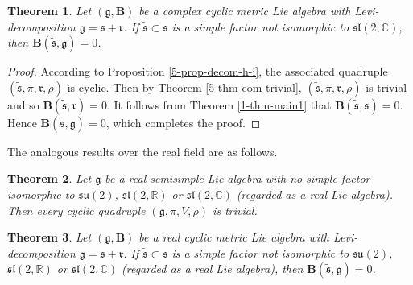 \documentclass[reqno]{amsart}
\newtheorem{thm}{Theorem}[section]
\theoremstyle{definition}
\begin{document}
\begin{thm}\label{5-thm-nondegerate-sl(2)}
Let  $(\mathfrak{g},\mathbf{B})$ be a complex  cyclic metric Lie algebra with Levi-decomposition $\mathfrak{g}=\mathfrak{s}+\mathfrak{r}$. If  $\tilde{\mathfrak{s}}\subset \mathfrak{s}$ is a simple factor  not isomorphic to $\mathfrak{sl}(2,\mathbb{C})$, then $\mathbf{B}(\tilde{\mathfrak{s}},\mathfrak{g})=0$.
\end{thm}
\begin{proof}
According to Proposition \ref{5-prop-decom-h-i}, the associated quadruple $(\tilde{\mathfrak{s}},\pi,\mathfrak{r},\rho)$ is cyclic. Then by Theorem \ref{5-thm-com-trivial}, $(\tilde{\mathfrak{s}},\pi,\mathfrak{r},\rho)$ is trivial and so
$\mathbf{B}(\tilde{\mathfrak{s}},\mathfrak{r})=0$.
It follows from Theorem \ref{1-thm-main1} that $\mathbf{B}(\tilde{\mathfrak{s}},\mathfrak{s})=0$.
Hence $\mathbf{B}(\tilde{\mathfrak{s}},\mathfrak{g})=0$, which completes the proof.
\end{proof}
The analogous results over the real field are as follows.
\begin{thm}
Let $\mathfrak{g}$ be a real semisimple Lie algebra with no simple factor isomorphic to $\mathfrak{su}(2)$,
$\mathfrak{sl}(2,\mathbb{R})$ or $\mathfrak{sl}(2,\mathbb{C})$ (regarded as a real Lie algebra).
Then every cyclic quadruple $(\mathfrak{g},\pi,V,\rho)$ is trivial.
\end{thm}
\begin{thm}
Let  $(\mathfrak{g},\mathbf{B})$ be a real  cyclic metric Lie algebra with Levi-decomposition $\mathfrak{g}=\mathfrak{s}+\mathfrak{r}$. If  $\tilde{\mathfrak{s}}\subset \mathfrak{s}$ is a simple factor not isomorphic to $\mathfrak{su}(2)$,
$\mathfrak{sl}(2,\mathbb{R})$ or $\mathfrak{sl}(2,\mathbb{C})$ (regarded as a real Lie algebra),
then $\mathbf{B}(\tilde{\mathfrak{s}},\mathfrak{g})=0$.
\end{thm}
\end{document}
